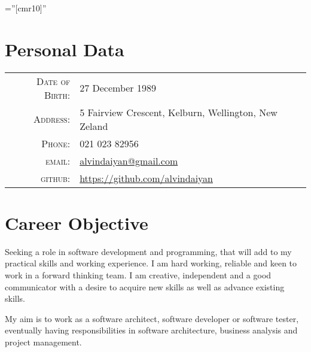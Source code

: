 \documentclass[a4paper,10pt]{article} %
\begin{document}
\pagestyle{empty} %

\font\fb=''[cmr10]'' %


\par{\bigskip\par} %

\section{Personal Data}

\begin{tabular}{rl}
\textsc{Date of Birth:} & 27 December 1989 \\
\textsc{Address:} & 5 Fairview Crescent, Kelburn, Wellington, New Zeland \\
\textsc{Phone:} & 021 023 82956\\
\textsc{email:} & \href{mailto:alvindaiyan@gmail.com}{alvindaiyan@gmail.com} \\
\textsc{github:} & \href{https://github.com/alvindaiyan}{https://github.com/alvindaiyan}
\end{tabular}




\section{Career Objective}

Seeking a role in software development and programming, that will add to my practical skills and working experience. I am hard working, reliable and keen to work in a forward thinking team. I am creative, independent and a good communicator with a desire to acquire new skills as well as advance existing skills.

My aim is to work as a software architect, software developer or software tester, eventually having responsibilities in software architecture, business analysis and project management.
\end{document}

